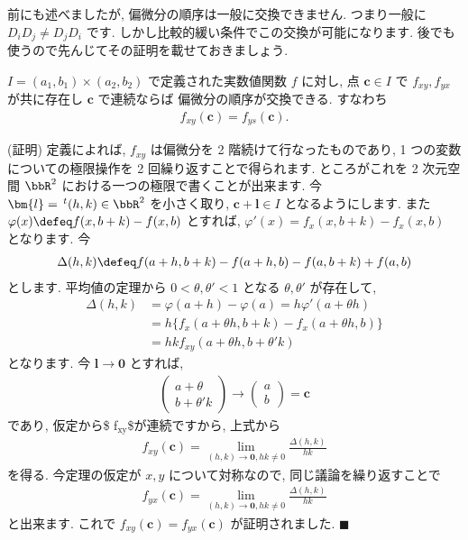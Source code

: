 \documentclass[openany, a4paper, oneside]{jsbook}
\begin{document}
前にも述べましたが, 偏微分の順序は一般に交換できません.
つまり一般に $D_iD_j\not=D_jD_i$ です.
しかし比較的緩い条件でこの交換が可能になります.
後でも使うので先んじてその証明を載せておきましょう.

\begin{thm}
$I=(a_1,b_1)\times (a_2,b_2)$ で定義された実数値関数 $f$ に対し,
点 $\bm{c}\in I$ で $f_{xy},f_{yx}$ が共に存在し $\bm{c}$ で連続ならば
偏微分の順序が交換できる. すなわち
    \begin{align}
        f_{xy}(\bm{c})
        =
        f_{ys}(\bm{c}).
    \end{align}
\end{thm}
(証明) 定義によれば,  $f_{xy}$ は偏微分を 2 階続けて行なったものであり,
1 つの変数についての極限操作を 2 回繰り返すことで得られます.
ところがこれを 2 次元空間 $\bbR^2$ における一つの極限で書くことが出来ます.
今 $\bm{l}=\,^t (h,k)\in\bbR^2$ を小さく取り,  $\bm{c}+\bm{l}\in I$ となるようにします.
また $\varphi (x)\defeq f (x,b+k)-f (x,b)$ とすれば,  $\varphi'(x)=f_x (x,b+k)-f_x (x,b)$ となります.
今
\begin{align}
    \Delta (h,k)
    \defeq
    f (a+h,b+k) - f (a+h,b) - f (a,b+k) + f (a,b)
\end{align}
とします. 平均値の定理から $0<\theta,\theta'<1$ となる $\theta,\theta'$ が存在して,
\begin{align}
    \Delta (h,k)
    &=
    \varphi (a+h) - \varphi (a)
    =
    h\varphi' (a+\theta h)\\
    &=
    h\{ f_x (a+\theta h,b+k) - f_x (a+\theta h,b) \}\\
    &=
    hkf_{xy}(a+\theta h,b+\theta' k)
\end{align}
となります. 今 $\bm{l}\to\bm{0}$ とすれば,
\begin{align}
 \begin{pmatrix}
  a+\theta\\ b+\theta' k
 \end{pmatrix}
 \to
 \begin{pmatrix}
 a\\
 b
 \end{pmatrix}
 =
 \bm{c}
\end{align}
であり, 仮定から\$ f$_{\text{xy}}$\$が連続ですから, 上式から
\begin{align}
 f_{xy}(\bm{c})
 =
 \lim_{(h,k)\to\bm{0},h k\not= 0}\frac{\Delta (h,k)} {h k}
\end{align}
を得る. 今定理の仮定が $x,y$ について対称なので, 同じ議論を繰り返すことで
\begin{align}
f_{yx}(\bm{c})
=
\lim_{(h,k)\to\bm{0},h k\not= 0}\frac{\Delta (h,k)} {h k}
\end{align}
と出来ます. これで $f_{xy}(\bm{c})=f_{yx}(\bm{c})$ が証明されました.  $\blacksquare$
\end{document}
